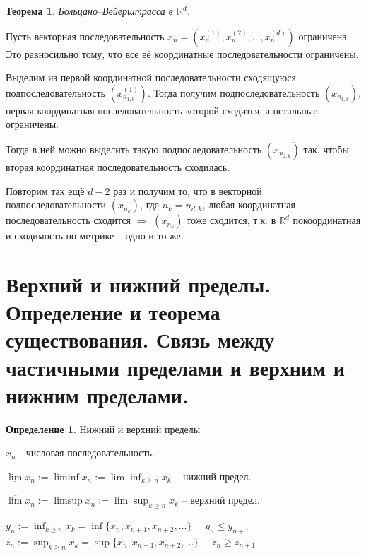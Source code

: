 \documentclass[12pt,letterpaper]{report}
\makeatletter
\newtheorem{theorem}{Теорема}
\theoremstyle{definition}
\newtheorem*{conj}{Определение}
\renewenvironment{proof}[1][\proofname]{%
   \par\pushQED{\qed}\normalfont%
   \topsep6\p@\@plus6\p@\relax
   \trivlist\item[\hskip\labelsep\bfseries#1\@addpunct{.}]%
   \ignorespaces
}{%
   \popQED\endtrivlist\@endpefalse
}
\makeatother
\begin{document}
    \begin{theorem}
    Больцано–Вейерштрасса в $\mathbb{R}^d$.
    \end{theorem}
    \begin{proof}
    Пусть векторная последовательность
    $x_n = (x_n^{(1)}, x_n^{(2)}, \dots, x_n^{(d)})$ ограничена.
    Это равносильно тому, что все её координатные последовательности
    ограничены.
    
    Выделим из первой координатной последовательности сходящуюся
    подпоследовательность $(x_{n_{1, k}}^{(1)})$. Тогда получим
    подпоследовательность $(x_{n_{1, k}})$, первая координатная
    последовательность которой сходится, а остальные ограничены.
    
    Тогда в ней можно выделить такую подпоследовательность
    $(x_{n_{2, k}})$ так, чтобы вторая координатная последовательность
    сходилась.
    
    Повторим так ещё $d - 2$ раз и получим то, что в векторной 
    подпоследовательности $(x_{n_{k}})$, где $n_k = n_{d, k}$, 
    любая координатная последовательность сходится $\Rightarrow$
    $(x_{n_{k}})$ тоже сходится, т.к. в $\mathbb{R}^d$ покоординатная и
    сходимость по метрике -- одно и то же.
    
    \end{proof}
    
    
    \section{Верхний и нижний пределы. Определение и
    теорема существования. Связь между частичными пределами и  
    верхним и нижним пределами.}
    
    \begin{conj}
    Нижний и верхний пределы
    \end{conj}
    $x_n$ - числовая последовательность.
    
    $\underline{\lim} x_n := \liminf x_n := \lim \inf_{k \geq n} x_k$ -- 
    нижний предел.
    
    $\overline{\lim} x_n := \limsup x_n := \lim \sup_{k \geq n} x_k$ -- 
    верхний предел.
    
    $y_n := \inf_{k \geq n} x_k = \inf\{x_n, x_{n+1}, x_{n+2}, \dots\}$
    $\quad y_n \leq y_{n+1}$\\
    $z_n := \sup_{k \geq n} x_k = \sup\{x_n, x_{n+1}, x_{n+2}, \dots\}$
    $\quad z_n \geq z_{n+1}$
    
\end{document}
